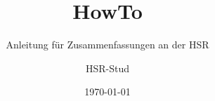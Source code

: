 \documentclass[titlepage=true]{scrartcl}
\title{HowTo}
\subtitle{Anleitung für Zusammenfassungen an der HSR}
\author{HSR-Stud}
\date{\today}
\begin{document}
\begin{titlepage}
	\thispagestyle{empty}
	\maketitle	
\end{titlepage}

\tableofcontents
\newpage



\end{document}
